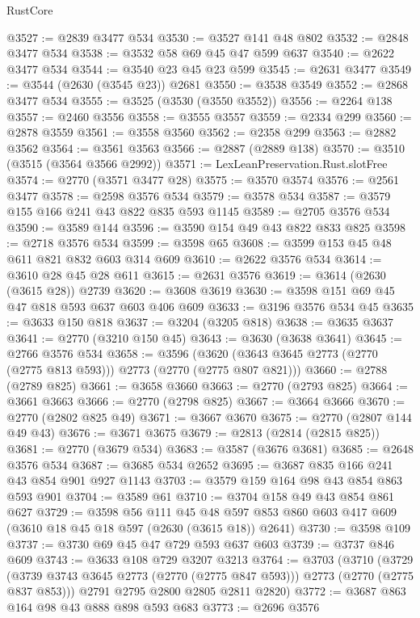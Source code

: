 \begin{lexlean}{RustCore}
\begin{coremodule}
@3527 := @2839 @3477 @534
@3530 := @3527 @141 @48 @802
@3532 := @2848 @3477 @534
@3538 := @3532 @58 @69 @45 @47 @599 @637
@3540 := @2622 @3477 @534
@3544 := @3540 @23 @45 @23 @599
@3545 := @2631 @3477
@3549 := @3544 (@2630 (@3545 @23)) @2681
@3550 := @3538 @3549
@3552 := @2868 @3477 @534
@3555 := @3525 (@3530 (@3550 @3552))
@3556 := @2264 @138
@3557 := @2460 @3556
@3558 := @3555 @3557
@3559 := @2334 @299
@3560 := @2878 @3559
@3561 := @3558 @3560
@3562 := @2358 @299
@3563 := @2882 @3562
@3564 := @3561 @3563
@3566 := @2887 (@2889 @138)
@3570 := @3510 (@3515 (@3564 @3566 @2992))
@3571 := LexLeanPreservation.Rust.slotFree
@3574 := @2770 (@3571 @3477 @28)
@3575 := @3570 @3574
@3576 := @2561 @3477
@3578 := @2598 @3576 @534
@3579 := @3578 @534
@3587 := @3579 @155 @166 @241 @43 @822 @835 @593 @1145
@3589 := @2705 @3576 @534
@3590 := @3589 @144
@3596 := @3590 @154 @49 @43 @822 @833 @825
@3598 := @2718 @3576 @534
@3599 := @3598 @65
@3608 := @3599 @153 @45 @48 @611 @821 @832 @603 @314 @609
@3610 := @2622 @3576 @534
@3614 := @3610 @28 @45 @28 @611
@3615 := @2631 @3576
@3619 := @3614 (@2630 (@3615 @28)) @2739
@3620 := @3608 @3619
@3630 := @3598 @151 @69 @45 @47 @818 @593 @637 @603 @406 @609
@3633 := @3196 @3576 @534 @45
@3635 := @3633 @150 @818
@3637 := @3204 (@3205 @818)
@3638 := @3635 @3637
@3641 := @2770 (@3210 @150 @45)
@3643 := @3630 (@3638 @3641)
@3645 := @2766 @3576 @534
@3658 := @3596 (@3620 (@3643 @3645 @2773 (@2770 (@2775 @813 @593))) @2773 (@2770 (@2775 @807 @821)))
@3660 := @2788 (@2789 @825)
@3661 := @3658 @3660
@3663 := @2770 (@2793 @825)
@3664 := @3661 @3663
@3666 := @2770 (@2798 @825)
@3667 := @3664 @3666
@3670 := @2770 (@2802 @825 @49)
@3671 := @3667 @3670
@3675 := @2770 (@2807 @144 @49 @43)
@3676 := @3671 @3675
@3679 := @2813 (@2814 (@2815 @825))
@3681 := @2770 (@3679 @534)
@3683 := @3587 (@3676 @3681)
@3685 := @2648 @3576 @534
@3687 := @3685 @534 @2652
@3695 := @3687 @835 @166 @241 @43 @854 @901 @927 @1143
@3703 := @3579 @159 @164 @98 @43 @854 @863 @593 @901
@3704 := @3589 @61
@3710 := @3704 @158 @49 @43 @854 @861 @627
@3729 := @3598
    @56
    @111
    @45
    @48
    @597
    @853
    @860
    @603
    @417
    @609
    (@3610 @18 @45 @18 @597 (@2630 (@3615 @18)) @2641)
@3730 := @3598 @109
@3737 := @3730 @69 @45 @47 @729 @593 @637 @603
@3739 := @3737 @846 @609
@3743 := @3633 @108 @729 @3207 @3213
@3764 := @3703
    (@3710
      (@3729 (@3739 @3743 @3645 @2773 (@2770 (@2775 @847 @593))) @2773 (@2770 (@2775 @837 @853)))
      @2791
      @2795
      @2800
      @2805
      @2811
      @2820)
@3772 := @3687 @863 @164 @98 @43 @888 @898 @593 @683
@3773 := @2696 @3576

\end{coremodule}
\end{lexlean}
